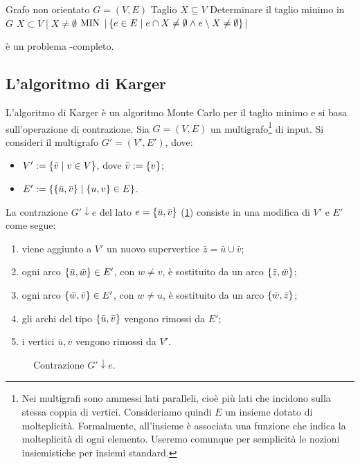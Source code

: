 \popt{\MinCut}
{Grafo non orientato $G=(V,E)$}
{Taglio $X\subseteq V$}
{Determinare il taglio minimo in $G$}
{$X\subset V\mid X\neq\emptyset$}
{$\mathrm{MIN}$}
{$| \left\{ e\in E\mid e\cap X\neq\emptyset\land e\setminus X\neq\emptyset \right\} |$}

\noindent\MinCut è un problema \NPO-completo.


\subsection{L'algoritmo di Karger}
L'algoritmo di Karger è un algoritmo Monte Carlo per il taglio minimo e si basa sull'operazione di contrazione.
Sia $G=(V,E)$ un multigrafo\footnote{Nei multigrafi sono ammessi lati paralleli, cioè più lati che incidono sulla stessa coppia di vertici. Consideriamo quindi $E$ un insieme dotato di molteplicità. Formalmente, all'insieme è associata una funzione che indica la molteplicità di ogni elemento. Useremo comunque per semplicità le nozioni insiemistiche per insiemi standard.} di input. Si consideri il multigrafo $G'=(V',E')$, dove:
\begin{itemize}
	\item $V':=\left\{ \bar v\mid v\in V \right\}$, dove $\bar v:=\left\{ v \right\}$;
	\item $E':=\left\{ \left\{ \bar u,\bar v \right\}\mid \left\{ u,v \right\}\in E \right\}$.
\end{itemize}
La contrazione $G'\downarrow e$ del lato $e=\left\{ \bar u,\bar v \right\}$ (\cref{fig:contrazione}) consiste in una modifica di $V'$ e $E'$ come segue:
\begin{enumerate}
	\item viene aggiunto a $V'$ un nuovo supervertice $\bar z=\bar u\cup\bar v$;
	\item ogni arco $\left\{ \bar u,\bar w \right\}\in E'$, con $w\neq v$, è sostituito da un arco $\left\{ \bar z,\bar w \right\}$;
	\item ogni arco $\left\{ \bar w,\bar v \right\}\in E'$, con $w\neq u$, è sostituito da un arco $\left\{ \bar w,\bar z \right\}$;
	\item gli archi del tipo $\left\{ \bar u,\bar v \right\}$ vengono rimossi da $E'$;
	\item i vertici $\bar u,\bar v$ vengono rimossi da $V'$.
\end{enumerate}

\begin{figure}[ht]
	\centering
	
	\caption{Contrazione $G'\downarrow e$.}
	\label{fig:contrazione}
\end{figure}

